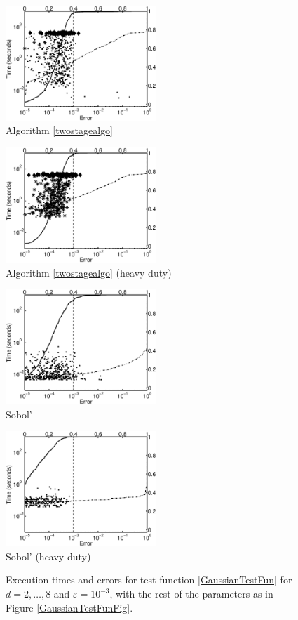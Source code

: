 \documentclass[graybox]{svmult}
\begin{document}
\begin{figure}
\centering
\begin{minipage}{5.7cm} \centering \includegraphics[width=5.7cm]{137gaussiand=6iidErrTime.eps} \\ Algorithm \ref{twostagealgo} \end{minipage}
\begin{minipage}{5.7cm} \centering \includegraphics[width=5.7cm]{137gaussiand=6iidheavyErrTime.eps} \\ Algorithm \ref{twostagealgo} (heavy duty) \end{minipage}
\begin{minipage}{5.7cm} \centering \includegraphics[width=5.7cm]{137gaussiand=6SobolErrTime.eps} \\ Sobol' \end{minipage}
\begin{minipage}{5.7cm} \centering \includegraphics[width=5.7cm]{137gaussiand=6SobolheavyErrTime.eps} \\ Sobol' (heavy duty) \end{minipage}
\caption{Execution times and errors for test function \eqref{GaussianTestFun} for $d=2, \ldots, 8$ and $\varepsilon=10^{-3}$, with the rest of the parameters as in Figure \ref{GaussianTestFunFig}.\label{GaussianTestFunHDFig}}
\end{figure}
\end{document}
